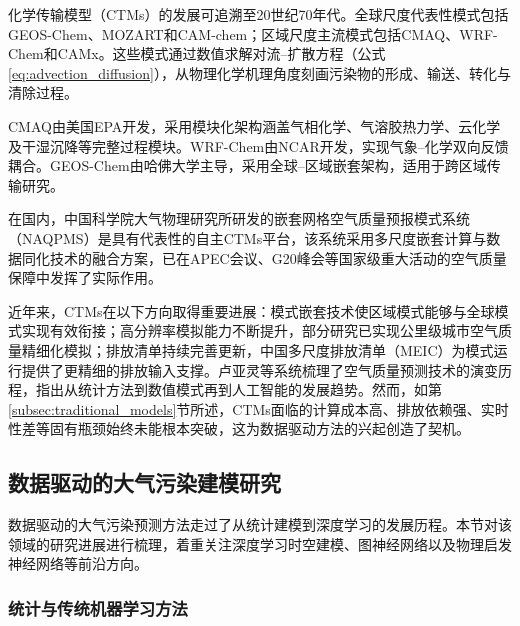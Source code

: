 化学传输模型（CTMs）的发展可追溯至20世纪70年代。全球尺度代表性模式包括GEOS-Chem\citep{bey2001global}、MOZART\citep{emmons2010description}和CAM-chem\citep{lamarque2012cam}；区域尺度主流模式包括CMAQ\citep{byun2006review}、WRF-Chem\citep{grell2005fully}和CAMx\citep{emery2024comprehensive}。这些模式通过数值求解对流--扩散方程（公式\eqref{eq:advection_diffusion}），从物理化学机理角度刻画污染物的形成、输送、转化与清除过程。

CMAQ由美国EPA开发，采用模块化架构涵盖气相化学、气溶胶热力学、云化学及干湿沉降等完整过程模块\citep{appel2021community}。WRF-Chem由NCAR开发，实现气象--化学双向反馈耦合\citep{grell2005fully}。GEOS-Chem由哈佛大学主导，采用全球--区域嵌套架构，适用于跨区域传输研究\citep{bey2001global}。

在国内，中国科学院大气物理研究所研发的嵌套网格空气质量预报模式系统（NAQPMS）是具有代表性的自主CTMs平台，该系统采用多尺度嵌套计算与数据同化技术的融合方案，已在APEC会议、G20峰会等国家级重大活动的空气质量保障中发挥了实际作用\citep{cn_wangzifa2006naqpms,wang2014modeling,cn_chenxueshun2015naqpms}。

近年来，CTMs在以下方向取得重要进展：模式嵌套技术使区域模式能够与全球模式实现有效衔接\citep{wang2015implementation}；高分辨率模拟能力不断提升，部分研究已实现公里级城市空气质量精细化模拟\citep{sicard2021high}；排放清单持续完善更新，中国多尺度排放清单（MEIC）\citep{zheng2018trends}为模式运行提供了更精细的排放输入支撑。卢亚灵等\citep{cn_luyaling2021}系统梳理了空气质量预测技术的演变历程，指出从统计方法到数值模式再到人工智能的发展趋势。然而，如第\ref{subsec:traditional_models}节所述，CTMs面临的计算成本高、排放依赖强、实时性差等固有瓶颈始终未能根本突破，这为数据驱动方法的兴起创造了契机。

\subsection{数据驱动的大气污染建模研究}
\label{subsec:ai_airquality}

数据驱动的大气污染预测方法走过了从统计建模到深度学习的发展历程\citep{reichstein2019deep,karniadakis2021physics}。本节对该领域的研究进展进行梳理，着重关注深度学习时空建模、图神经网络以及物理启发神经网络等前沿方向。

\subsubsection{统计与传统机器学习方法}

